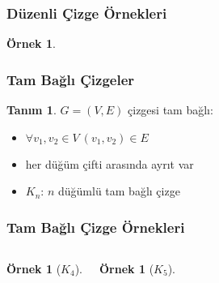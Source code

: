 \documentclass[dvipsnames]{beamer}
\theoremstyle{definition}
\newtheorem{tanim}[theorem]{Tanım}
\theoremstyle{example}
\newtheorem{ornek}[theorem]{Örnek}
\theoremstyle{plain}
\begin{document}
\begin{frame}
  \frametitle{Düzenli Çizge Örnekleri}

  \begin{ornek}
    \begin{center}
    \end{center}
  \end{ornek}
\end{frame}

\begin{frame}
  \frametitle{Tam Bağlı Çizgeler}

  \begin{tanim}
    $G=(V,E)$ çizgesi \alert{tam bağlı}:
    \begin{itemize}
      \item $\forall v_1,v_2 \in V~(v_1,v_2) \in E$
    \end{itemize}
  \end{tanim}

  \pause
  \begin{itemize}
    \item her düğüm çifti arasında ayrıt var
    \item $K_n$: $n$ düğümlü tam bağlı çizge
  \end{itemize}
\end{frame}

\begin{frame}
  \frametitle{Tam Bağlı Çizge Örnekleri}

  \begin{columns}
    \begin{ornek}[$K_4$]
      \begin{center}
      \end{center}
    \end{ornek}

    \begin{ornek}[$K_5$]
      \begin{center}
      \end{center}
    \end{ornek}
  \end{columns}
\end{frame}
\end{document}
